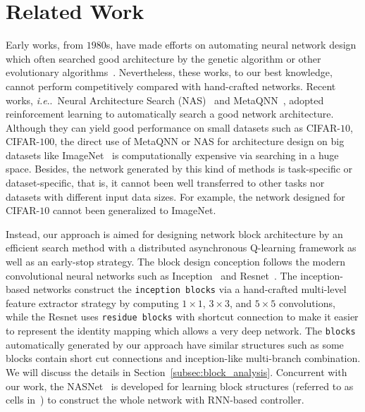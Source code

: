 \documentclass[10pt,journal,compsoc]{IEEEtran}
\makeatletter
\DeclareRobustCommand\onedot{\futurelet\@let@token\@onedot}
\def\@onedot{\ifx\@let@token.\else.\null\fi\xspace}
\def\ie{\emph{i.e}\onedot} \def\Ie{\emph{I.e}\onedot}
\makeatother
\begin{document}
\section{Related Work}
Early works, from $1980$s, have made efforts on automating neural network design which often searched good architecture by the genetic algorithm or other evolutionary algorithms~\cite{schaffer1992combinations,stanley2002evolving,stanley2009hypercube,suganuma2017genetic,saxena2016convolutional,domhan2015speeding,xie2017genetic}. Nevertheless, these works, to our best knowledge, cannot perform competitively compared with hand-crafted networks. 
Recent works, \ie~Neural Architecture Search (NAS)~\cite{zoph2016neural} and MetaQNN~\cite{baker2016designing}, adopted reinforcement learning to automatically search a good network architecture. 
Although they can yield good performance on small datasets such as CIFAR-$10$, CIFAR-$100$, the direct use of MetaQNN or NAS for architecture design on big datasets like ImageNet~\cite{deng2009imagenet} is computationally expensive via searching in a huge space.
Besides, the network generated by this kind of methods is task-specific or dataset-specific, that is, it cannot been well transferred to other tasks nor datasets with different input data sizes. For example, the network designed for CIFAR-$10$ cannot been generalized to ImageNet.


Instead, our approach is aimed for designing network block architecture by an efficient search method with a distributed asynchronous Q-learning framework as well as an early-stop strategy.
The block design conception follows the modern convolutional neural networks such as Inception~\cite{szegedy2015going,ioffe2015batch,szegedy2015rethinking} and Resnet~\cite{he2015deep,he2016identity}. The inception-based networks construct the \texttt{inception blocks} via a hand-crafted multi-level feature extractor strategy by computing $1\times 1$, $3\times 3$, and $5\times 5$ convolutions, while the Resnet uses \texttt{residue blocks} with shortcut connection to make it easier to represent the identity mapping which allows a very deep network. 
The \texttt{blocks} automatically generated by our approach have similar structures such as some blocks contain short cut connections and inception-like multi-branch combination. We will discuss the details in Section~\ref{subsec:block_analysis}.
Concurrent with our work, the NASNet~\cite{zoph2018learning} is developed for learning block structures (referred to as cells in~\cite{zoph2018learning}) to construct the whole network with RNN-based controller.
\end{document}
